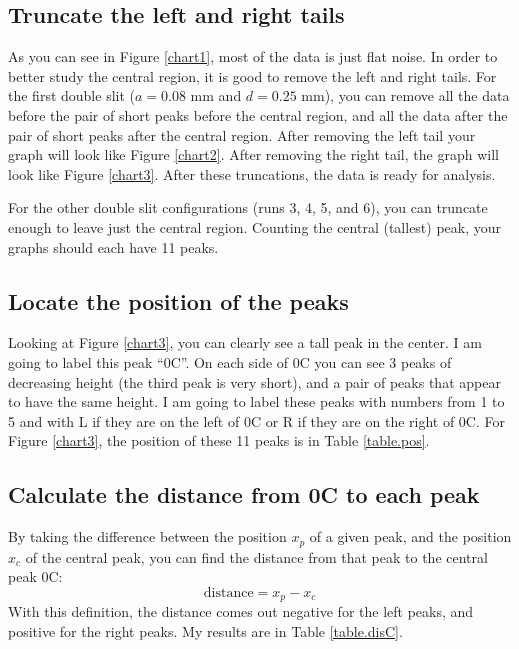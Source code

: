 \subsection{Truncate the left and right tails}
As you can see in Figure \ref{chart1}, most of the data is just flat noise. In order to better study the central region, it is good to remove the left and right tails. For the first double slit ($a = 0.08$ mm and $d = 0.25$ mm), you can remove all the data before the pair of short peaks before the central region, and all the data after the pair of short peaks after the central region. After removing the left tail your graph will look like Figure \ref{chart2}. After removing the right tail, the graph will look like Figure \ref{chart3}. After these truncations, the data is ready for analysis.

For the other double slit configurations (runs 3, 4, 5, and 6), you can truncate enough to leave just the central region. Counting the central (tallest) peak, your graphs should each have 11 peaks.
\subsection{Locate the position of the peaks}
Looking at Figure \ref{chart3}, you can clearly see a tall peak in the center. I am going to label this peak ``0C''. On each side of 0C you can see 3 peaks of decreasing height (the third peak is very short), and a pair of peaks that appear to have the same height. I am going to label these peaks with numbers from 1 to 5 and with L if they are on the left of 0C or R if they are on the right of 0C. For Figure \ref{chart3}, the position of these 11 peaks is in Table \ref{table.pos}.
\subsection{Calculate the distance from 0C to each peak}
By taking the difference between the position $x_{p}$ of a given peak, and the position $x_{c}$ of the central peak, you can find the distance from that peak to the central peak 0C:
\begin{equation}
	\text{distance} = x_{p} - x_{c}
\end{equation}
With this definition, the distance comes out negative for the left peaks, and positive for the right peaks. My results are in Table \ref{table.disC}.
